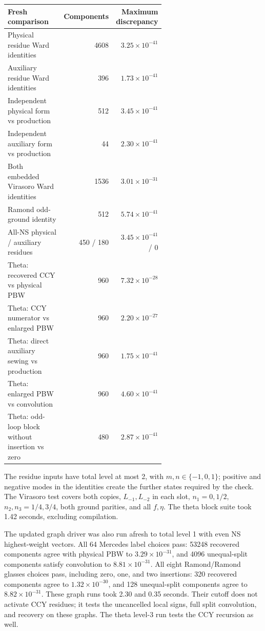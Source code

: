\documentclass[11pt]{article}
\numberwithin{equation}{section}
\begin{document}
\begin{center}\small
\begin{tabular}{@{}p{0.61\linewidth}rr@{}}
\toprule
Fresh comparison & Components & Maximum discrepancy\\
\midrule
Physical residue Ward identities & 4608 & $3.25\times10^{-41}$\\
Auxiliary residue Ward identities & 396 & $1.73\times10^{-41}$\\
Independent physical form vs production & 512 & $3.45\times10^{-41}$\\
Independent auxiliary form vs production & 44 & $2.30\times10^{-41}$\\
Both embedded Virasoro Ward identities & 1536 & $3.01\times10^{-31}$\\
Ramond odd-ground identity & 512 & $5.74\times10^{-41}$\\
All-NS physical / auxiliary residues & 450 / 180 & $3.45\times10^{-41}$ / $0$\\
Theta: recovered CCY vs physical PBW & 960 & $7.32\times10^{-28}$\\
Theta: CCY numerator vs enlarged PBW & 960 & $2.20\times10^{-27}$\\
Theta: direct auxiliary sewing vs production & 960 & $1.75\times10^{-41}$\\
Theta: enlarged PBW vs convolution & 960 & $4.60\times10^{-41}$\\
Theta: odd-loop block without insertion vs zero & 480 & $2.87\times10^{-41}$\\
\bottomrule
\end{tabular}\end{center}
The residue inputs have total level at most 2, with $m,n\in\{-1,0,1\}$;
positive and negative modes in the identities create the further states
required by the check. The Virasoro test covers both copies,
$L_{-1},L_{-2}$ in each slot, $n_1=0,1/2$,
$n_2,n_3=1/4,3/4$, both ground parities, and all $f,\eta$.
The theta block suite took 1.42 seconds, excluding compilation.

The updated graph driver was also run afresh to total level 1 with even
NS highest-weight vectors. All 64 Mercedes label choices pass: 53248
recovered components agree with physical PBW to $3.29\times10^{-31}$,
and 4096 unequal-split components satisfy convolution to
$8.81\times10^{-31}$. All eight Ramond/Ramond glasses choices pass,
including zero, one, and two insertions: 320 recovered components agree
to $1.32\times10^{-30}$, and 128 unequal-split components agree to
$8.82\times10^{-31}$. These graph runs took 2.30 and 0.35 seconds.
Their cutoff does not activate CCY residues; it tests the uncancelled
local signs, full split convolution, and recovery on these graphs.
The theta level-3 run tests the CCY recursion as well.
\end{document}
